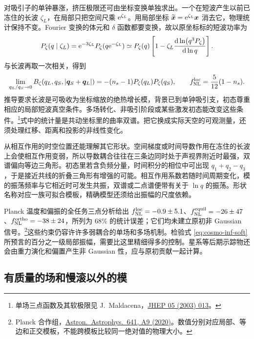 对吸引子的单钟暴涨，挤压极限还可由坐标变换单独求出。一个在短波产生以前已冻住的长波 $\zeta_L$，在局部只把空间尺乘 $\mathrm{e}^{\zeta_L}$。用局部坐标 $\widetilde{\bm x}=\mathrm{e}^{\zeta_L}\bm x$ 消去它，物理统计保持不变。Fourier 变换的体元和 $\delta$ 函数都要变换，故以原坐标标的短波功率为
\[
 P_\zeta(q\mid\zeta_L)
 =\mathrm{e}^{-3\zeta_L}P_\zeta(q\mathrm{e}^{-\zeta_L})
 \simeq P_\zeta(q)\left[1-\zeta_L
       \frac{\dd\ln(q^3P_\zeta)}{\dd\ln q}\right].
\]
与长波再取一次相关，得到
\begin{equation}\label{eq:cosmo-inf-soft}
 \lim_{q_L/q_S\to0}
 B_\zeta(q_L,q_S,|\bm q_S+\bm q_L|)
 =-(n_s-1)P_\zeta(q_L)P_\zeta(q_S),
 \qquad f_{\rm NL}^{\rm loc}=\frac5{12}(1-n_s).
\end{equation}
推导要求长波是可吸收为坐标缩放的绝热增长模，背景已到单钟吸引支，初态尊重相应的局部短波真空条件。多场转化、非吸引阶段或某些激发初态能改变这些条件。\footnote{单场三点函数及其软极限见 J.~Maldacena，\href{https://arxiv.org/abs/astro-ph/0210603}{JHEP 05 (2003) 013}。}式中的统计量是共动坐标里的曲率双谱。把它换成实际天空的可观测量，还须处理红移、距离和投影的非线性变化。

从相互作用的时空位置还能理解其它形状。空间梯度或时间导数作用在冻住的长波上会使相互作用变弱，所以导数耦合往往在三条边同时处于声视界附近时最强，双谱偏向等边三角形。初态里若含负频分量，时间积分的相位中可出现 $q_1+q_2-q_3$，于是接近共线的折叠三角形有增强的可能。相互作用系数若随时间周期变化，模的振荡频率与它相近时可发生共振，双谱或二点谱便带有关于 $\ln q$ 的振荡。形状名称对应一族可拟合模板，精确模型还须给出振幅的尺度依赖。

Planck 温度和偏振的全任务三点分析给出 $f_{\rm NL}^{\rm loc}=-0.9\pm5.1$、$f_{\rm NL}^{\rm equil}=-26\pm47$、$f_{\rm NL}^{\rm ortho}=-38\pm24$，所列为 $68\%$ 的统计误差；它们均未建立原初非 Gaussian 信号。\footnote{Planck 合作组，\href{https://arxiv.org/abs/1905.05697}{Astron.\ Astrophys.\ 641, A9 (2020)}。数值分别对应局部、等边和正交模板，不能跨模板比较同一绝对值的物理大小。}这些约束仍容许许多弱耦合的单场和多场机制。检验式 \eqref{eq:cosmo-inf-soft} 所预言的百分之一级局部振幅，需要比这里精细得多的控制。星系等后期示踪物还会由重力演化和偏置产生非 Gaussian 性，应与原初贡献一起计算。

\subsection{有质量的场和慢滚以外的模}\label{sec:cosmo-inf-massive}

